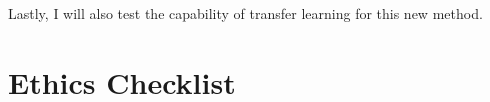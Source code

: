 \documentclass[12pt,twoside]{report}
\begin{document}
Lastly, I will also test the capability of transfer learning for this new method.

%
%


\chapter{Ethics Checklist}
\end{document}
